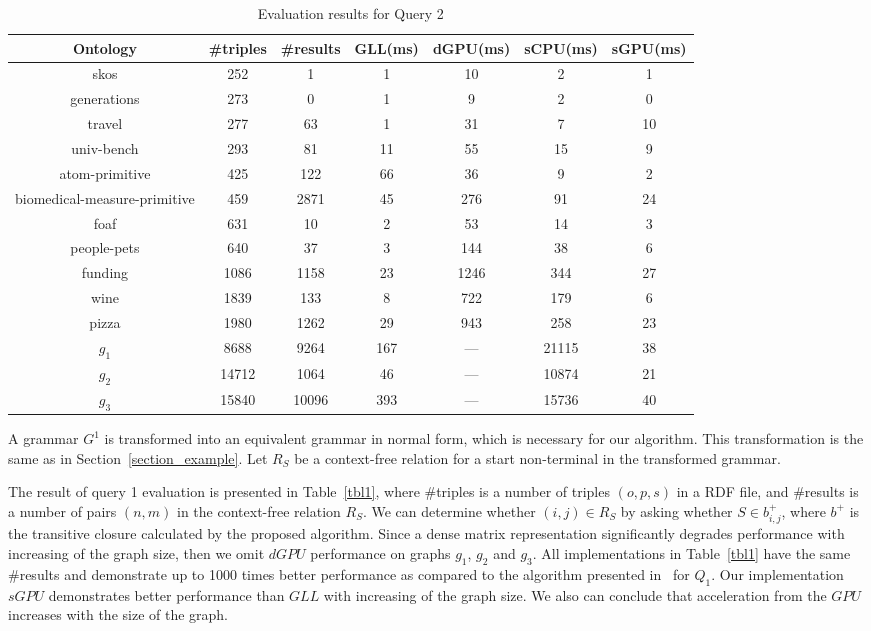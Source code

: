 \begin{table*}[h]
\centering
\caption{Evaluation results for Query 2}
\label{tbl2}

\begin{tabular}{ | c | c | c | c | c | c | c |}
\hline
Ontology & \#triples & \#results & GLL(ms) & dGPU(ms) & sCPU(ms) & sGPU(ms) \\
\hline 
\hline
skos        & 252 & 1 & 1 & 10 & 2 & 1\\
generations & 273 & 0 & 1 & 9 & 2 & 0\\
travel      & 277 & 63 & 1 & 31 & 7 & 10\\
univ-bench  & 293 & 81 & 11 & 55 & 15 & 9\\
atom-primitive & 425 & 122 & 66 & 36 & 9 & 2\\
biomedical-measure-primitive & 459 & 2871 & 45 & 276 & 91 & 24\\
foaf        & 631 & 10 & 2 & 53 & 14 & 3\\
people-pets & 640 & 37 & 3 & 144 & 38 & 6\\
funding     & 1086 & 1158 & 23 & 1246 & 344 & 27\\
wine        & 1839 & 133 & 8 & 722 & 179 & 6\\
pizza       & 1980 & 1262 & 29 & 943 & 258 & 23\\
$g_{1}$     & 8688 & 9264 & 167 & --- & 21115 & 38\\
$g_{2}$     & 14712 & 1064 & 46 & --- & 10874 & 21\\
$g_{3}$     & 15840 & 10096 & 393 & --- & 15736 & 40\\
\hline
\end{tabular}

\end{table*}


A grammar $G^1$ is transformed into an equivalent grammar in normal form, which is necessary for our algorithm. This transformation is the same as in Section~\ref{section_example}. Let $R_S$ be a context-free relation for a start non-terminal in the transformed grammar.

The result of query 1 evaluation is presented in Table~\ref{tbl1}, where \#triples is a number of triples $(o,p,s)$ in a RDF file, and \#results is a number of pairs $(n,m)$ in the context-free relation $R_S$. We can determine whether $(i,j) \in R_S$ by asking whether $S \in b^+_{i,j}$, where $b^+$ is the transitive closure calculated by the proposed algorithm. Since a dense matrix representation significantly degrades performance with increasing of the graph size, then we omit $dGPU$ performance on graphs $g_1$, $g_2$ and $g_3$. All implementations in Table~\ref{tbl1} have the same \#results and demonstrate up to 1000 times better performance as compared to the algorithm presented in~\cite{RDF} for $Q_1$. Our implementation $sGPU$ demonstrates better performance than $GLL$ with increasing of the graph size. We also can conclude that acceleration from the $GPU$ increases with the size of the graph.

